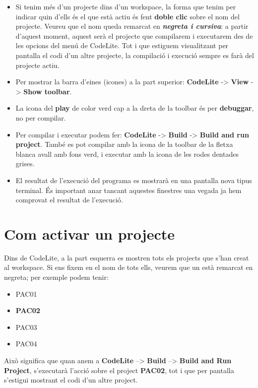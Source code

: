 \documentclass[
]{book}
\providecommand{\tightlist}{%
  \setlength{\itemsep}{0pt}\setlength{\parskip}{0pt}}
\begin{document}
\begin{itemize}
\item
  Si tenim més d'un projecte dins d'un workspace, la forma que tenim per indicar quin d'ells és el que està actiu és fent \textbf{doble clic} sobre el nom del projecte. Veureu que el nom queda remarcat en \textbf{\emph{negreta i cursiva}}: a partir d'aquest moment, aquest serà el projecte que compilarem i executarem des de les opcions del menú de CodeLite. Tot i que estiguem visualitzant per pantalla el codi d'un altre projecte, la compilació i execució sempre es farà del projecte actiu.
\item
  Per mostrar la barra d'eines (icones) a la part superior: \textbf{CodeLite} -\textgreater{} \textbf{View} -\textgreater{} \textbf{Show toolbar}.
\item
  La icona del \textbf{play} de color verd cap a la dreta de la toolbar és per \textbf{debuggar}, no per compilar.
\item
  Per compilar i executar podem fer: \textbf{CodeLite} -\textgreater{} \textbf{Build} -\textgreater{} \textbf{Build and run project}. També es pot compilar amb la icona de la toolbar de la fletxa blanca avall amb fons verd, i executar amb la icona de les rodes dentades grises.
\item
  El resultat de l'execució del programa es mostrarà en una pantalla nova tipus terminal. És important anar tancant aquestes finestres una vegada ja hem comprovat el resultat de l'execució.
\end{itemize}

\hypertarget{com-activar-un-projecte}{%
\section{Com activar un projecte}\label{com-activar-un-projecte}}

Dins de CodeLite, a la part esquerra es mostren tots els projects que s'han creat al workspace. Si ens fixem en el nom de tots ells, veurem que un està remarcat en negreta; per exemple podem tenir:

\begin{itemize}
\tightlist
\item
  PAC01
\item
  \textbf{PAC02}
\item
  PAC03
\item
  PAC04
\end{itemize}

Això significa que quan anem a \textbf{CodeLite} --\textgreater{} \textbf{Build} --\textgreater{} \textbf{Build and Run Project}, s'executarà l'acció sobre el project \textbf{PAC02}, tot i que per pantalla s'estigui mostrant el codi d'un altre project.
\end{document}
